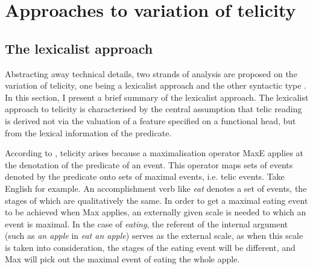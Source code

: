 \documentclass[output=paper]{langsci/langscibook}
\begin{document}
\section{Approaches to variation of telicity}\label{sec:17.3}

\subsection{The lexicalist approach}\label{sub:17.3.1}

Abstracting away technical details, two strands of analysis are proposed on the
variation of telicity, one being a lexicalist approach
\citep{filip2005telicparameter,filiprothstein2005} and the other syntactic type
\citep{Borer2005a,Borer2005b,MacDonald2008,travis2010inner}.
In this section, I present a brief summary of the lexicalist approach. The
lexicalist approach to telicity is characterised by the central assumption that
telic reading is derived not via the valuation of a feature specified on a
functional head, but from the lexical information of the predicate.

According to \textcite{filip2005telicparameter,filiprothstein2005},
telicity arises because a maximalisation operator MaxE applies at the
denotation of the predicate of an event. This operator maps sets of events
denoted by the predicate onto sets of maximal events, i.e. telic events. Take
English for example. An accomplishment verb like \emph{eat} denotes a set of
events, the stages of which are qualitatively the same. In order to get a
maximal eating event to be achieved when Max applies, an externally
given scale is needed to which an event is maximal. In the case of
\emph{eating}, the referent of the internal argument (such as \emph{an apple}
in \emph{eat an apple}) serves as the external scale, as when this scale is
taken into consideration, the stages of the eating event will be different, and
Max will pick out the maximal event of eating the whole apple.
\end{document}
